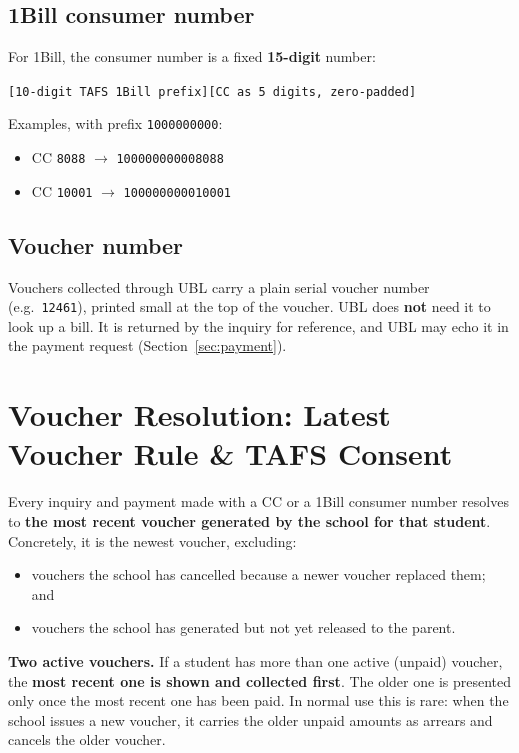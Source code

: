 \documentclass[11pt]{article}
\begin{document}
\subsection{1Bill consumer number}\label{sec:onebill}
For 1Bill, the consumer number is a fixed \textbf{15-digit} number:
\begin{center}
\texttt{[10-digit TAFS 1Bill prefix][CC as 5 digits, zero-padded]}
\end{center}
\noindent Examples, with prefix \texttt{1000000000}:
\begin{itemize}[nosep]
  \item CC \texttt{8088} $\rightarrow$ \texttt{100000000008088}
  \item CC \texttt{10001} $\rightarrow$ \texttt{100000000010001}
\end{itemize}

\medskip
\noindent{}

\subsection{Voucher number}
Vouchers collected through UBL carry a plain serial voucher number (e.g.\ \texttt{12461}), printed small
at the top of the voucher. UBL does \textbf{not} need it to look up a bill. It is returned by the
inquiry for reference, and UBL may echo it in the payment request (Section~\ref{sec:payment}).

\section{Voucher Resolution: Latest Voucher Rule \& TAFS Consent}\label{sec:latest}

Every inquiry and payment made with a CC or a 1Bill consumer number resolves to
\textbf{the most recent voucher generated by the school for that student}. Concretely, it is the newest
voucher, excluding:
\begin{itemize}[nosep]
  \item vouchers the school has cancelled because a newer voucher replaced them; and
  \item vouchers the school has generated but not yet released to the parent.
\end{itemize}
\textbf{Two active vouchers.} If a student has more than one active (unpaid) voucher, the \textbf{most recent one is
shown and collected first}. The older one is presented only once the most recent one has been paid. In normal use
this is rare: when the school issues a new voucher, it carries the older unpaid amounts as arrears and cancels the
older voucher.
\end{document}
